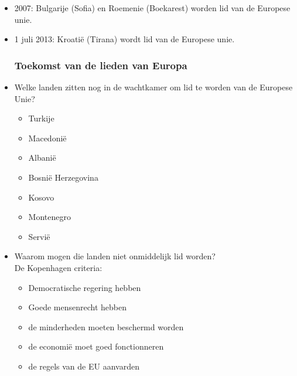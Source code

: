 \documentclass{article}
\begin{document}
\begin{itemize}
\begin{multicols}{2}
\begin{itemize}
            \item Estland: Talinn
            \item Hongarije: Budapest
            \item letland: Riga
            \item Malta: Valetta
            \item Poland: Warschauw
            \item Tsequië: Praag
            \item Slovenië: Ljubljana
            \item Slovakijë: Bratislave.
        \end{itemize}
    \end{multicols}
    \item 2007: Bulgarije (Sofia) en Roemenie (Boekarest) worden lid van de Europese unie.
    \item 1 juli 2013: Kroatië (Tirana) wordt lid van de Europese unie.
    \subsubsection{Toekomst van de lieden van Europa}
    \item Welke landen zitten nog in de wachtkamer om lid te worden van de Europese Unie?
    \begin{multicols}{2}
        \begin{itemize}
            \item Turkije
            \item Macedonië
            \item Albanië
            \item Bosnië Herzegovina
            \item Kosovo
            \item Montenegro
            \item Servië
        \end{itemize}
    \end{multicols}
    \item Waarom mogen die landen niet onmiddelijk lid worden?\\
    De Kopenhagen criteria:
    \begin{itemize}
        \item Democratische regering hebben
        \item Goede mensenrecht hebben
        \item de minderheden moeten beschermd worden
        \item de economië moet goed fonctionneren
        \item de regels van de EU aanvarden
    \end{itemize}
\end{itemize}
\end{document}
